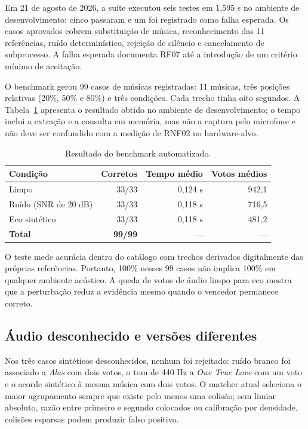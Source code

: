 \documentclass[12pt,a4paper]{article}
\begin{document}
Em 21 de agosto de 2026, a suíte executou seis testes em 1,595 s no ambiente de
desenvolvimento: cinco passaram e um foi registrado como falha esperada. Os casos
aprovados cobrem substituição de música, reconhecimento das 11 referências, ruído
determinístico, rejeição de silêncio e cancelamento de subprocesso. A falha
esperada documenta RF07 até a introdução de um critério mínimo de aceitação.

O benchmark gerou 99 casos de músicas registradas: 11 músicas, três posições
relativas (20\%, 50\% e 80\%) e três condições. Cada trecho tinha oito segundos.
A Tabela~\ref{tab:benchmark} apresenta o resultado obtido no ambiente de
desenvolvimento; o tempo inclui a extração e a consulta em memória, mas não a
captura pelo microfone e não deve ser confundido com a medição de RNF02 no
hardware-alvo.

\begin{table}[H]
    \centering
    \caption{Resultado do benchmark automatizado.}
    \label{tab:benchmark}
    \begin{tabular}{lrrr}
        \toprule
        \textbf{Condição} & \textbf{Corretos} & \textbf{Tempo médio} &
        \textbf{Votos médios}\\
        \midrule
        Limpo & 33/33 & 0,124 s & 942,1\\
        Ruído (SNR de 20 dB) & 33/33 & 0,118 s & 716,5\\
        Eco sintético & 33/33 & 0,118 s & 481,2\\
        \midrule
        \textbf{Total} & \textbf{99/99} & --- & ---\\
        \bottomrule
    \end{tabular}
\end{table}

O teste mede acurácia dentro do catálogo com trechos derivados digitalmente das
próprias referências. Portanto, 100\% nesses 99 casos não implica 100\% em qualquer
ambiente acústico. A queda de votos de áudio limpo para eco mostra que a
perturbação reduz a evidência mesmo quando o vencedor permanece correto.

\subsection{Áudio desconhecido e versões diferentes}

Nos três casos sintéticos desconhecidos, nenhum foi rejeitado: ruído branco foi
associado a \emph{Alas} com dois votos, o tom de 440 Hz a \emph{One True Love}
com um voto e o acorde sintético à mesma música com dois votos. O matcher atual
seleciona o maior agrupamento sempre que existe pelo menos uma colisão; sem limiar
absoluto, razão entre primeiro e segundo colocados ou calibração por densidade,
colisões esparsas podem produzir falso positivo.
\end{document}
